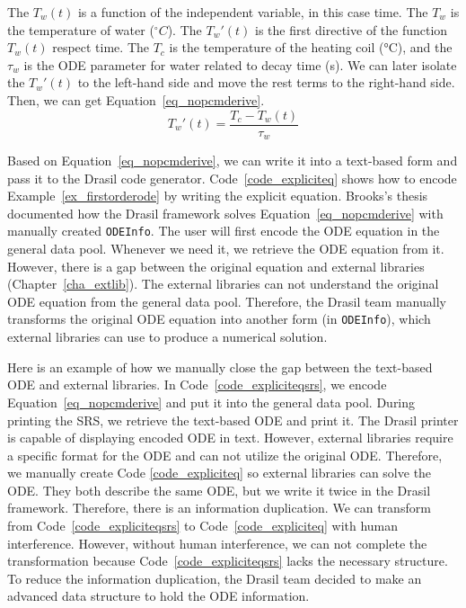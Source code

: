 The $T_w(t)$ is a function of the independent variable, in this case time. The $T_w$ is the temperature of water ($ ^\circ C $). The $T_w'(t)$ is the first directive of the function $T_w(t)$ respect time. The $T_c$ is the temperature of the heating coil (°C), and the $\tau_w$ is the ODE parameter for water related to decay time (s). We can later isolate the $T_w'(t)$ to the left-hand side and move the rest terms to the right-hand side. Then, we can get Equation~\ref{eq_nopcmderive}.
\begin{equation} \label{eq_nopcmderive}
	T_{w}'(t) = \frac{T_{c} - T_{w}(t)}{\tau_{w}}
\end{equation}

Based on Equation~\ref{eq_nopcmderive}, we can write it into a text-based form and pass it to the Drasil code generator. Code~\ref{code_expliciteq} shows how to encode Example~\ref{ex_firstorderode} by writing the explicit equation. Brooks's thesis~\citep{brooks} documented how the Drasil framework solves Equation~\ref{eq_nopcmderive} with manually created \verb|ODEInfo|. The user will first encode the ODE equation in the general data pool. Whenever we need it, we retrieve the ODE equation from it. However, there is a gap between the original equation and external libraries (Chapter~\ref{cha_extlib}). The external libraries can not understand the original ODE equation from the general data pool. Therefore, the Drasil team manually transforms the original ODE equation into another form (in \verb|ODEInfo|), which external libraries can use to produce a numerical solution.

Here is an example of how we manually close the gap between the text-based ODE and external libraries. In Code~\ref{code_expliciteqsrs}, we encode Equation~\ref{eq_nopcmderive} and put it into the general data pool. During printing the SRS, we retrieve the text-based ODE and print it. The Drasil printer is capable of displaying encoded ODE in text. However, external libraries require a specific format for the ODE and can not utilize the original ODE. Therefore, we manually create Code \ref{code_expliciteq} so external libraries can solve the ODE. They both describe the same ODE, but we write it twice in the Drasil framework. Therefore, there is an information duplication. We can transform from Code~\ref{code_expliciteqsrs} to Code~\ref{code_expliciteq} with human interference. However, without human interference, we can not complete the transformation because Code~\ref{code_expliciteqsrs} lacks the necessary structure. To reduce the information duplication, the Drasil team decided to make an advanced data structure to hold the ODE information.


